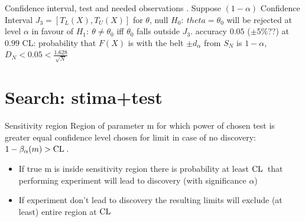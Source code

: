 \documentclass[asd-beamer.tex]{subfiles}
\begin{document}
\begin{frame}{Confidence interval, test and needed observations}\frameintoc
{}. Suppose $(1-\alpha)$ Confidence Interval $J_3=[T_L(X),T_U(X)]$ for $\theta$, null $H_0:\ theta=\theta_0$ will be rejected at level $\alpha$ in favour of $H_1:\ \theta\neq\theta_0$ iff $\theta_0$ falls outside $J_3$.
 accuracy $0.05$ ($\pm5\%$??) at $0.99$ CL: probability that $F(X)$ is with the belt $\pm d_{\alpha}$ from $S_N$ is $1-\alpha$, $D_N<0.05<\frac{1.628}{\sqrt{N}}$
\end{frame}


\section{Search: stima+test}

\begin{frame}{Sensitivity region}
Region of parameter m for which power of chosen test is greater equal confidence level chosen for limit in case of no discovery: $1-\beta_{\alpha}(m)>\operatorname{CL}{}$.
\begin{itemize}
\item If true m is inside sensitivity region there is probability at least $\operatorname{CL}{}$ that performing experiment will lead to discovery (with significance $\alpha$)
\item If experiment don't lead to discovery the resulting limits will exclude (at least) entire region at $\operatorname{CL}{}$
\end{itemize}
\end{frame}
\end{document}
